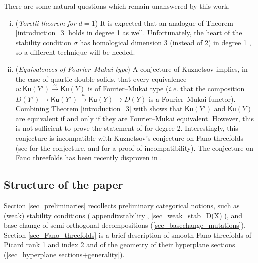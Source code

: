 \documentclass[11pt]{amsart}
\theoremstyle{definition}
\newcommand{\sM}{\mathcal{M}}
\newcommand{\Ku}{\mathsf{Ku}}
\begin{document}
\medskip

There are some natural questions which remain unanswered by this work.
\begin{enumerate}[(i)]
    \item (\textit{Torelli theorem for $d=1$}) It is expected that an analogue of Theorem \ref{introduction_3} holds in degree 1 as well. Unfortunately, the heart of the stability condition $\sigma$ has homological dimension 3 (instead of 2) in degree 1 \cite[Remark 2.6]{PR20_veronese}, so a different technique will be needed.
    \item (\textit{Equivalences of Fourier--Mukai type}) A conjecture of Kuznetsov \cite[Conjecture~3.7]{kuz07HPD} implies, in the case of quartic double solids, that every equivalence $u\colon \Ku(Y')\xrightarrow{\sim}\Ku(Y)$ is of Fourier--Mukai type (\textit{i.e.} that the composition $D(Y')\to \Ku(Y')\xrightarrow{u}\Ku(Y)\to D(Y) $ is a Fourier--Mukai functor). Combining Theorem \ref{introduction_3} with \cite[Proposition~3.5]{BT16} shows that $\Ku(Y')$ and $\Ku(Y)$ are equivalent if and only if they are Fourier--Mukai equivalent. However, this is not sufficient to prove the statement of  \cite[Conjecture~3.7]{kuz07HPD} for degree 2. 
    Interestingly, this conjecture is incompatible with Kuznetsov's conjecture on Fano threefolds (see \cite[Conjecture~3.7]{Kuz09_threefolds} for the conjecture, and \cite[Theorem 4.2]{BT16} for a proof of incompatibility). The conjecture on Fano threefolds has been recently disproven in \cite{Zha20}.

\end{enumerate}


\subsection*{Structure of the paper}
Section \ref{sec_preliminaries} recollects preliminary categorical notions, such as (weak) stability conditions (\ref{appendixstability}, \ref{sec_weak_stab_D(X)}), and base change of semi-orthogonal decompositions (\ref{sec_basechange_mutations}). 
Section \ref{sec_Fano_threefolds} is a brief description of smooth Fano threefolds of Picard rank 1 and index 2 and of the geometry of their hyperplane sections (\ref{sec_hyperplane sections+generality}). 
\end{document}

